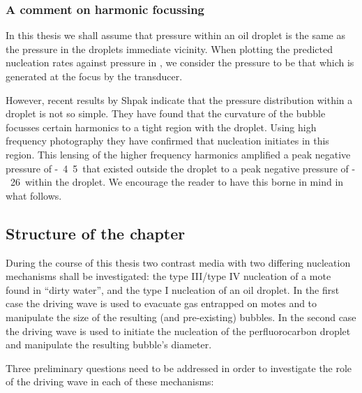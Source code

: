 \subsubsection{A comment on harmonic focussing}

In this thesis we shall assume that pressure within an oil droplet is the same as the pressure in the droplets immediate vicinity.  
When plotting the predicted nucleation rates against pressure in ,
we consider the  pressure to be that which is generated at the focus by the transducer.

However, recent results by Shpak\cite{Shpak2014} indicate that the pressure distribution within a droplet is not so simple.
They have found that the curvature of the bubble focusses certain harmonics to a tight region with the droplet.
Using high frequency photography they have confirmed that nucleation initiates in this region.
This lensing of the higher frequency harmonics amplified a peak negative pressure of \unit{-4.5}\mega\pascal\ that existed outside the droplet 
to a peak negative pressure of \unit{-26}\mega\pascal\ within the droplet.
We encourage the reader to have this borne in mind in what follows.



\subsection{Structure of the chapter}


During the course of this thesis two contrast media with two differing nucleation mechanisms shall be investigated:
the type III/type IV nucleation of a mote found in ``dirty water'',
and the type I nucleation of an oil droplet.
In the first case the driving wave is used to evacuate gas entrapped on motes
and to manipulate the size of the resulting (and pre-existing) bubbles.
In the second case the driving wave is used to initiate the nucleation of the perfluorocarbon droplet
and manipulate the resulting bubble's diameter.

Three preliminary questions need to be addressed in order to investigate the role of the driving wave in each of these mechanisms:


